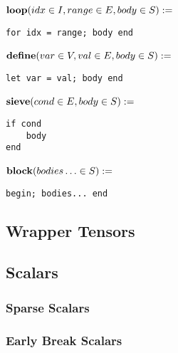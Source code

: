 \noindent\begin{minipage}{.5\linewidth}
\raggedleft $\text{\textbf{loop}}(idx \in I, range \in E, body \in S) :=$~
\end{minipage}%
\begin{minipage}{.5\linewidth}
\begin{verbatim}
for idx = range; body end
\end{verbatim}
\end{minipage}

\noindent\begin{minipage}{.5\linewidth}
\raggedleft $\text{\textbf{define}}(var \in V, val \in E, body \in S) :=$~
\end{minipage}%
\begin{minipage}{.5\linewidth}
\begin{verbatim}
let var = val; body end
\end{verbatim}
\end{minipage}

\noindent\begin{minipage}{.5\linewidth}
\raggedleft $\text{\textbf{sieve}}(cond \in E, body \in S) :=$~
\end{minipage}%
\begin{minipage}{.5\linewidth}
\begin{verbatim}
if cond
    body
end
\end{verbatim}
\end{minipage}

\noindent\begin{minipage}{.5\linewidth}
\raggedleft $\text{\textbf{block}}(bodies\ldots \in S) :=$~
\end{minipage}%
\begin{minipage}{.5\linewidth}
\begin{verbatim}
begin; bodies... end
\end{verbatim}
\end{minipage}


\subsection{Wrapper Tensors}

\subsection{Scalars}

\subsubsection{Sparse Scalars}
\subsubsection{Early Break Scalars}


